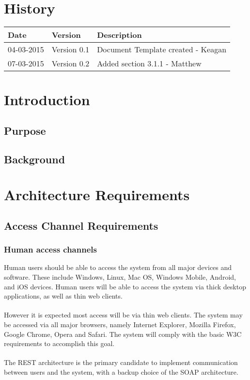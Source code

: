 \documentclass[12pt]{article}
\begin{document}


\section{History}
\begin{tabular}{|l|l|l|}
\hline
Date & Version & Description\\
\hline
04-03-2015 & Version 0.1 & Document Template created - Keagan\\
\hline
07-03-2015 & Version 0.2 & Added section 3.1.1 - Matthew\\
\hline


\end{tabular}

\newpage
\tableofcontents
\newpage
\listoffigures
\newpage

\section{Introduction}

\subsection{Purpose}

\subsection{Background}

\section{Architecture Requirements}
\subsection{Access Channel Requirements}

\subsubsection{Human access channels}
Human users should be able to access the system from all major devices and software. These include Windows, Linux, Mac OS, Windows Mobile, Android, and iOS devices. Human users will be able to access the system via thick desktop applications, as well as thin web clients. 
\\\\However it is expected most access will be via thin web clients.
The system may be accessed via all major browsers, namely Internet Explorer, Mozilla Firefox, Google Chrome, Opera and Safari. The system will comply with the basic W3C requirements to accomplish this goal.
\\\\The REST architecture is the primary candidate to implement communication between users and the system, with a backup choice of the SOAP architecture.
\end{document}
